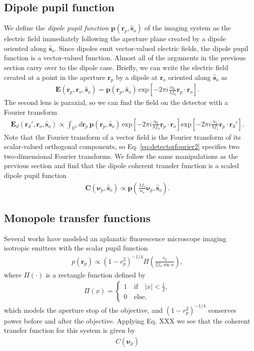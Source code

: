 \documentclass[]{osa-article}
\providecommand{\mb}[1]{\mathbf{#1}}
\providecommand{\ro}{\mathbf{\mathbf{r}}_o}
\providecommand{\so}{\mathbf{\hat{s}}_o}
\providecommand{\rp}{\mathbf{r}_p}
\providecommand{\rd}{\mathbf{r}_d}
\providecommand{\mbb}[1]{\mathbb{#1}}
\providecommand{\bs}[1]{\boldsymbol{#1}}
\providecommand{\bvp}{\bs{\nu}_p}
\begin{document}
\subsection{Dipole pupil function} 
We define the \textit{dipole pupil function} $\mb{p}(\rp, \so)$ of the imaging
system as the electric field immediately following the aperture plane created by
a dipole oriented along $\so$. Since dipoles emit vector-valued electric fields,
the dipole pupil function is a vector-valued function. Almost all of the
arguments in the previous section carry over to the dipole case. Briefly, we can
write the electric field created at a point in the aperture $\rp$ by a dipole at
$\ro$ oriented along $\so$ as
 \begin{align}
   \mb{E}(\rp, \ro, \so) = \mb{p}(\rp, \so)\,\text{exp}\left[-2\pi i \frac{n_0}{\lambda f_0} \rp\cdot\ro \right]. \label{eq:pupil2}
 \end{align}
 The second lens is paraxial, so we can find the field on the detector with a
 Fourier transform
 \begin{align}
   \mb{E}_d(\rd', \ro, \so) \propto \int_{\mbb{R}^2}d\rp\, \mb{p}(\rp, \so)\,\text{exp}\left[-2\pi i \frac{n_0}{\lambda f_0} \rp\cdot\ro \right]\text{exp}\left[-2\pi i \frac{n_1}{\lambda f_1} \rp\cdot\rd' \right]. \label{eq:detectorfourier2}
\end{align}
Note that the Fourier transform of a vector field is the Fourier transform of
its scalar-valued orthogonal components, so Eq. \ref{eq:detectorfourier2}
specifies two two-dimensional Fourier transforms. We follow the same
manipulations as the previous section and find that the dipole coherent transfer
function is a scaled dipole pupil function
\begin{align}
  \mb{C}(\bvp, \so) \propto \mb{p}\left(\frac{\lambda f_o}{n_o}\bvp, \so\right). \label{eq:monopupil}
\end{align}

\subsection{Monopole transfer functions}
Several works \cite{petrov2017, backlund2018} have modeled an aplanatic
fluorescence microscope imaging isotropic emitters with the scalar pupil
function
\begin{align}
  p(\rp) \propto (1 - r_p^2)^{-1/4}\Pi\left(\frac{r_p}{2f_o\sin\alpha}\right), 
\end{align}
where $\Pi(\cdot)$ is a rectangle function defined by
\begin{align}
  \Pi(x) = 
  \begin{cases}
    1\quad \text{if}\quad |x| < \frac{1}{2},\\
    0\quad \text{else},
  \end{cases}
\end{align}
which models the aperture stop of the objective, and $(1 - r_p^2)^{-1/4}$
conserves power before and after the objective. Applying Eq. XXX we see that the
coherent transfer function for this system is given by
\begin{align}
  C(\bvp)
\end{align}
\end{document}
